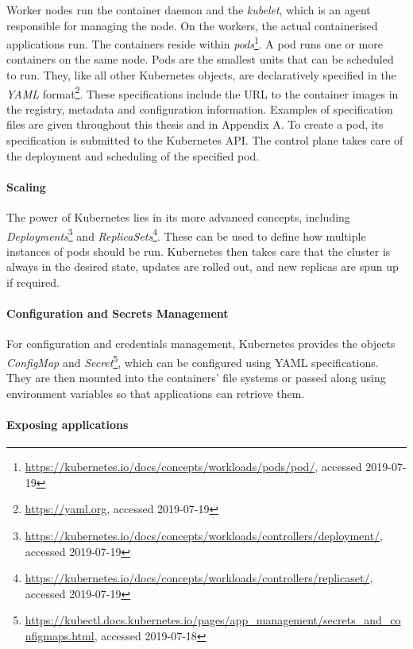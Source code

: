 Worker nodes run the container daemon and the \textit{kubelet}, which is an agent responsible for managing the node. On the workers, the actual containerised applications run. The containers reside within \textit{pods}\footnote{\url{https://kubernetes.io/docs/concepts/workloads/pods/pod/}, accessed 2019-07-19}. A pod runs one or more containers on the same node. Pods are the smallest units that can be scheduled to run. They, like all other Kubernetes objects, are declaratively specified in the \textit{YAML} format\footnote{\url{https://yaml.org}, accessed 2019-07-19}. These specifications include the URL to the container images in the registry, metadata and configuration information. Examples of specification files are given throughout this thesis and in Appendix A. To create a pod, its specification is submitted to the Kubernetes API. The control plane takes care of the deployment and scheduling of the specified pod. 

\paragraph{Scaling}

The power of Kubernetes lies in its more advanced concepts, including \textit{Deployments}\footnote{\url{https://kubernetes.io/docs/concepts/workloads/controllers/deployment/}, \\ accessed 2019-07-19} and \textit{ReplicaSets}\footnote{\url{https://kubernetes.io/docs/concepts/workloads/controllers/replicaset/}, \\ accessed 2019-07-19}. These can be used to define how multiple instances of pods should be run. Kubernetes then takes care that the cluster is always in the desired state, updates are rolled out, and new replicas are spun up if required.

\paragraph{Configuration and Secrets Management}

For configuration and credentials management, Kubernetes provides the objects \textit{ConfigMap} and \textit{Secret}\footnote{\url{https://kubectl.docs.kubernetes.io/pages/app_management/secrets_and_configmaps.html}, accessed 2019-07-18}, which can be configured using YAML specifications. They are then mounted into the containers' file systems or passed along using environment variables so that applications can retrieve them.

\paragraph{Exposing applications}

